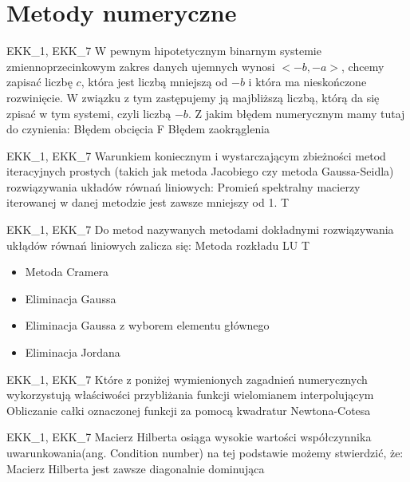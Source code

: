\chapter{Metody numeryczne}
\PartialToc

\answer
{EKK\_1, EKK\_7 W pewnym hipotetycznym binarnym systemie zmiennoprzecinkowym zakres danych ujemnych wynosi $<-b,-a>$, chcemy zapisać liczbę $c$, która jest liczbą mniejszą od $-b$ i która ma nieskończone rozwinięcie. W związku z tym zastępujemy ją majbliższą liczbą, którą da się zpisać w tym systemi, czyli liczbą $-b$. Z jakim błędem numerycznym mamy tutaj do czynienia:}
{Błędem obcięcia}
{F}
{Błędem zaokrąglenia}
{}

\answer
{EKK\_1, EKK\_7 Warunkiem koniecznym i wystarczającym zbieżności metod iteracyjnych prostych (takich jak metoda Jacobiego czy metoda Gaussa-Seidla) rozwiązywania układów równań liniowych:}
{Promień spektralny macierzy iterowanej w danej metodzie jest zawsze mniejszy od 1.}
{T}
{}
{}

\answer
{EKK\_1, EKK\_7 Do metod nazywanych metodami dokładnymi rozwiązywania ukłądów równań liniowych zalicza się: }
{Metoda rozkładu LU}
{T}
{\begin{itemize}
\item Metoda Cramera
\item Eliminacja Gaussa
\item Eliminacja Gaussa z wyborem elementu głównego
\item Eliminacja Jordana
\end{itemize}}
{}

\answer
{EKK\_1, EKK\_7 Które z poniżej wymienionych zagadnień numerycznych wykorzystują właściwości przybliżania funkcji wielomianem interpolującym}
{Obliczanie całki oznaczonej funkcji za pomocą kwadratur Newtona-Cotesa}
{}
{}%
{}

\answer
{EKK\_1, EKK\_7 Macierz Hilberta osiąga wysokie wartości współczynnika uwarunkowania(ang. Condition number) na tej podstawie możemy stwierdzić, że:}
{Macierz Hilberta jest zawsze diagonalnie dominująca}
{}
{}
{}

